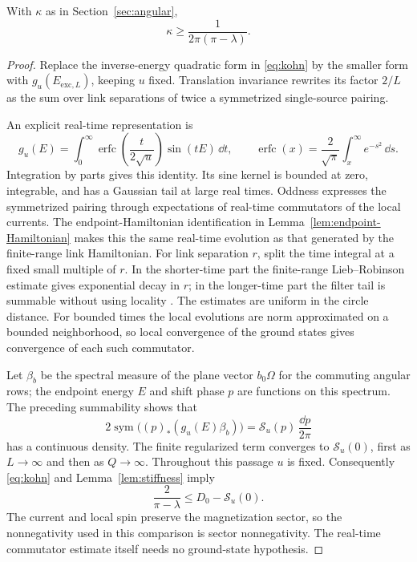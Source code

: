 \begin{lemma}\label{lem:infrared}
With \(\kappa\) as in Section~\ref{sec:angular},
\begin{equation}\label{eq:kappa-lower}
 \kappa\ge\frac1{2\pi(\pi-\lambda)}.
\end{equation}
\end{lemma}
\begin{proof}
Replace the inverse-energy quadratic form in \eqref{eq:kohn} by
the smaller form with \(g_u(E_{\mathrm{exc},L})\), keeping \(u\) fixed.
Translation invariance rewrites its factor \(2/L\) as the sum over
link separations of twice a symmetrized single-source pairing.

An explicit real-time representation is
\[
 g_u(E)=\int_0^\infty
       \operatorname{erfc}\!\left(\frac{t}{2\sqrt u}\right)
       \sin(tE)\,\dd t,\qquad
 \operatorname{erfc}(x)=\frac2{\sqrt\pi}\int_x^\infty e^{-s^2}\,\dd s.
\]
Integration by parts gives this identity. Its sine kernel is bounded at
zero, integrable, and has a Gaussian tail at large real times.
Oddness expresses the symmetrized pairing through expectations of
real-time commutators of the local currents.
The endpoint-Hamiltonian identification in
Lemma~\ref{lem:endpoint-Hamiltonian} makes this the same real-time evolution
as that generated by the finite-range link Hamiltonian.
For link separation \(r\), split the time integral at a fixed small
multiple of \(r\). In the shorter-time part the finite-range
Lieb--Robinson estimate gives exponential decay in \(r\); in the
longer-time part the filter tail is summable without using locality
\cite{LiebRobinson1972}. The estimates are uniform in the circle distance.
For bounded times the local evolutions are norm approximated on a bounded
neighborhood, so local convergence of the ground states gives convergence
of each such commutator.

Let \(\beta_b\) be the spectral measure of the plane vector
\(b_0\Omega\) for the commuting angular rows; the endpoint energy
\(E\) and shift phase \(p\) are functions on this spectrum. The preceding summability shows that
\[
 2\operatorname{sym}\bigl((p)_*(g_u(E)\beta_b)\bigr)
       =\mathcal S_u(p)\,\frac{\dd p}{2\pi}
\]
has a continuous density. The finite regularized term converges to
\(\mathcal S_u(0)\), first as \(L\to\infty\) and then as
\(Q\to\infty\). Throughout this passage \(u\) is fixed.
Consequently \eqref{eq:kohn} and Lemma~\ref{lem:stiffness} imply
\begin{equation}\label{eq:regularized-stiffness}
 \frac2{\pi-\lambda}\le D_0-\mathcal S_u(0).
\end{equation}
The current and local spin preserve the magnetization sector, so the
nonnegativity used in this comparison is sector nonnegativity. The
real-time commutator estimate itself needs no ground-state hypothesis.


\end{proof}
